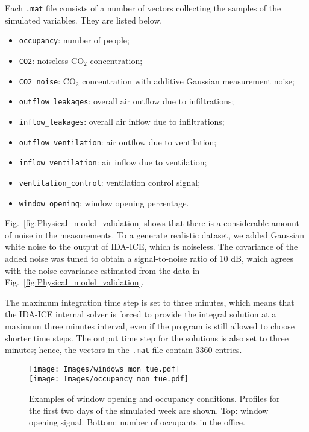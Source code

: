 \documentclass{article}
\begin{document}
Each \texttt{.mat} file consists of a number of vectors collecting the samples
of the simulated variables. They are listed below.
\begin{itemize}
\item \texttt{occupancy}: number of people;
\item \texttt{CO2}: noiseless CO$_2$ concentration;
\item \texttt{CO2\_noise}: CO$_2$ concentration with additive Gaussian measurement noise;
\item \texttt{outflow\_leakages}: overall air outflow due to infiltrations;
\item \texttt{inflow\_leakages}: overall air inflow due to infiltrations;
\item \texttt{outflow\_ventilation}: air outflow due to ventilation;
\item \texttt{inflow\_ventilation}: air inflow due to ventilation;
\item \texttt{ventilation\_control}: ventilation control signal;
\item \texttt{window\_opening}: window opening percentage.
\end{itemize}

Fig.~\ref{fig:Physical_model_validation} shows that there
is a considerable amount of noise in the measurements. To a generate realistic
dataset, we added Gaussian white noise to the output of IDA-ICE, which is
noiseless. The covariance of the added noise was tuned to obtain a
signal-to-noise ratio of 10 dB, which agrees with the noise covariance
estimated from the data in Fig.~\ref{fig:Physical_model_validation}.

The maximum integration time step is set to three minutes, which means that the
IDA-ICE internal solver is forced to provide the integral solution at a maximum
three minutes interval, even if the program is still allowed to choose shorter
time steps. The output time step for the solutions is also set to three minutes;
hence, the vectors in the \texttt{.mat} file contain 3360 entries.

\begin{figure}[htb]
\centering
\texttt{[image: Images/windows\_mon\_tue.pdf]}\\
\texttt{[image: Images/occupancy\_mon\_tue.pdf]}
  \caption{Examples of window opening and occupancy conditions. Profiles for the first two days of the simulated week are shown. Top: window
opening signal. Bottom:
number of occupants in the office.}\label{fig:occupancy_pattern}
\end{figure}
\end{document}

